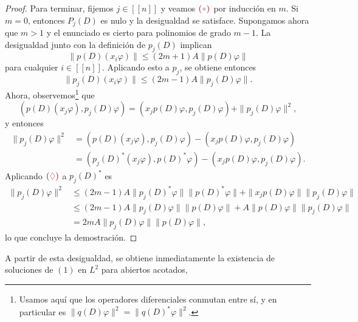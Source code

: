 \documentclass[11pt]{article}
\theoremstyle{colored}
\newcommand{\nat}[1]{[\![#1]\!]}
\newcommand{\ip}[1]{( #1 )}
\newcommand{\paint}[1]{\color{color}{#1}}
\newcommand{\tpaint}[1]{\paint{\textbf{#1}}}
\begin{document}
\begin{proof}
Para terminar, fijemos $j \in \nat{n}$ y veamos $\tpaint{($\ast$)}$ por inducción en $m$. Si $m = 0$, entonces $P_j(D)$ es nulo y la desigualdad se satisface. Supongamos ahora que $m > 1$ y el enunciado es cierto para polinomios de grado $m-1$. La desigualdad junto con la definición de $p_j(D)$ implican
\[
\|p(D)(x_i\varphi)\| \leq (2m+1)A\|p(D)\varphi\| \tag{$\lozenge$}
\]
para cualquier $i \in \nat{n}$. Aplicando esto a $p_j$, se obtiene entonces 
\[
\|p_j(D)(x_i\varphi)\| \leq (2m-1)A\|p_j(D)\varphi\|.
\]
Ahora, observemos\footnote{Usamos aquí que los operadores diferenciales conmutan entre sí, y en particular es $\|q(D)\varphi\|^2 = \|q(D)^\ast \varphi\|^2$.} que
\[
\ip{p(D)(x_j\varphi),p_j(D)\varphi} = \ip{x_jp(D)\varphi,p_j(D)\varphi} + \|p_j(D)\varphi\|^2,
\]
y entonces
\begin{align*}
\|p_j(D)\varphi\|^2 &= \ip{p(D)(x_j\varphi),p_j(D)\varphi} - \ip{x_jp(D)\varphi,p_j(D)\varphi}\\
&= \ip{p_j(D)^\ast(x_j\varphi),p(D)^\ast\varphi} - \ip{x_jp(D)\varphi,p_j(D)\varphi}.
\end{align*}
Aplicando $\tpaint{($\lozenge$)}$ a $p_j(D)^\ast$ es
\begin{align*}
\|p_j(D)\varphi\|^2&\leq (2m-1)A\|p_j(D)^\ast\varphi\|\|p(D)^\ast\varphi\| + \|x_jp(D)\varphi\|\|p_j(D)\varphi\|\\
& \leq (2m-1)A\|p_j(D)\varphi\|\|p(D)\varphi\| + A\|p(D)\varphi\|\|p_j(D)\varphi\|\\
& = 2mA\|p_j(D)\varphi\|\|p(D)\varphi\|,
\end{align*}
lo que concluye la demostración.
\end{proof}

A partir de esta desigualdad, se obtiene inmediatamente la existencia de soluciones de $(1)$ en $L^2$ para abiertos acotados, 
\end{document}
